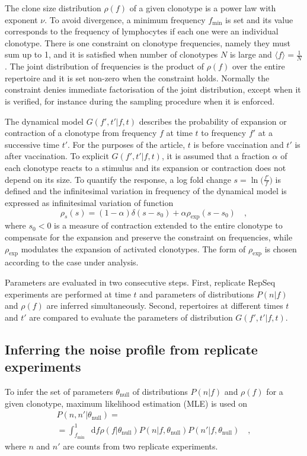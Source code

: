 \documentclass[a4paper,twocolumn]{article}
\newcommand{\dd}{\mathop{}\!\mathrm{d}}
\begin{document}
The clone size distribution $\rho(f)$ of a given clonotype is a power law with exponent $\nu$. To avoid divergence, a minimum frequency $f_\mathrm{min}$ is set and its value corresponds to the frequency of lymphocytes if each one were an individual clonotype. There is one constraint on clonotype frequencies, namely they must sum up to 1, and it is satisfied when number of clonotypes $N$ is large and $\langle f \rangle = \frac{1}{N}$. %
The joint distribution of frequencies is the product of $\rho(f)$ over the entire repertoire and it is set non-zero when the constraint holds. Normally the constraint denies immediate factorisation of the joint distribution, except when it is verified, for instance during the sampling procedure when it is enforced.

The dynamical model $G(f', t'|f, t)$ describes the probability of expansion or contraction of a clonotype from frequency $f$ at time $t$ to frequency $f'$ at a successive time $t'$. For the purposes of the article, $t$ is before vaccination and $t'$ is after vaccination. To explicit $G(f', t'|f, t)$, it is assumed that a fraction $\alpha$ of each clonotype reacts to a stimulus and its expansion or contraction does not depend on its size. To quantify the response, a log fold change $s = \ln \big( \frac{f'}{f} \big)$ is defined and the infinitesimal variation in frequency of the dynamical model is expressed as infinitesimal variation of function
\begin{equation*}
  \rho_s(s) = (1 - \alpha) \delta(s - s_0) + \alpha \rho_\mathrm{exp} (s - s_0) \quad ,
\end{equation*}
where $s_0 < 0$ is a measure of contraction extended to the entire clonotype to compensate for the expansion and preserve the constraint on frequencies, while $\rho_\mathrm{exp}$ modulates the expansion of activated clonotypes. The form of $\rho_\mathrm{exp}$ is chosen according to the case under analysis.

Parameters are evaluated in two consecutive steps. First, replicate RepSeq experiments are performed at time $t$ and parameters of distributions $P(n|f)$ and $\rho(f)$ are inferred simultaneously. Second, repertoires at different times $t$ and $t'$ are compared to evaluate the parameters of distribution $G(f', t'|f, t)$.

\subsection{Inferring the noise profile from replicate experiments}
To infer the set of parameters $\theta_\mathrm{null}$ of distributions $P(n|f)$ and $\rho(f)$ for a given clonotype, maximum likelihood estimation (MLE) is used on
\begin{multline*}
  P(n, n'|\theta_\mathrm{null}) = \\
  = \int_{f_\mathrm{min}}^1 \dd{f} \rho(f|\theta_\mathrm{null}) P(n|f, \theta_\mathrm{null}) P(n'|f, \theta_\mathrm{null}) \quad ,
\end{multline*}
where $n$ and $n'$ are counts from two replicate experiments.
\end{document}
